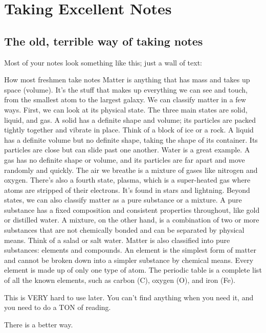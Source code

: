 \documentclass[../../main.tex]{subfiles}
\begin{document}
\chapter{Taking Excellent Notes}

\section{The old, terrible way of taking notes}

Most of your notes look something like this; just a wall of text:

\begin{boxRed}{How most freshmen take notes}
Matter is anything that has mass and takes up space (volume). It's the stuff that makes up everything we can see and touch, from the smallest atom to the largest galaxy. We can classify matter in a few ways. First, we can look at its physical state. The three main states are solid, liquid, and gas. A solid has a definite shape and volume; its particles are packed tightly together and vibrate in place. Think of a block of ice or a rock. A liquid has a definite volume but no definite shape, taking the shape of its container. Its particles are close but can slide past one another. Water is a great example. A gas has no definite shape or volume, and its particles are far apart and move randomly and quickly. The air we breathe is a mixture of gases like nitrogen and oxygen. There's also a fourth state, plasma, which is a super-heated gas where atoms are stripped of their electrons. It's found in stars and lightning. Beyond states, we can also classify matter as a pure substance or a mixture. A pure substance has a fixed composition and consistent properties throughout, like gold or distilled water. A mixture, on the other hand, is a combination of two or more substances that are not chemically bonded and can be separated by physical means. Think of a salad or salt water.  Matter is also classified into pure substances: elements and compounds. An element is the simplest form of matter and cannot be broken down into a simpler substance by chemical means. Every element is made up of only one type of atom. The periodic table is a complete list of all the known elements, such as carbon (C), oxygen (O), and iron (Fe).
\end{boxRed}

This is VERY hard to use later.  You can't find anything when you need it, and you need to do a TON of reading.

There is a better way.
\end{document}
